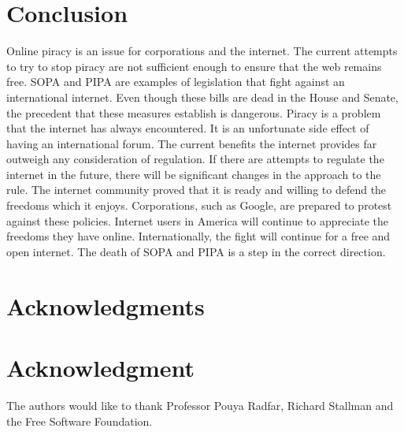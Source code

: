 \documentclass[11pt,journal,compsoc]{IEEEtran}
\begin{document}
\section{Conclusion}
Online piracy is an issue for corporations and the internet. The current attempts to try to stop piracy are not sufficient enough to ensure that the web remains free. SOPA and PIPA are examples of legislation that fight against an international internet. Even though these bills are dead in the House and Senate, the precedent that these measures establish is dangerous. Piracy is a problem that the internet has always encountered. It is an unfortunate side effect of having an international forum. The current benefits the internet provides far outweigh any consideration of regulation.  If there are attempts to regulate the internet in the future, there will be significant changes in the approach to the rule. The internet community proved that it is ready and willing to defend the freedoms which it enjoys. Corporations, such as Google, are prepared to protest against these policies. Internet users in America will continue to appreciate the freedoms they have online. Internationally, the fight will continue for a free and open internet. The death of SOPA and PIPA is a step in the correct direction.

\ifCLASSOPTIONcompsoc
  \section*{Acknowledgments}
\else
  \section*{Acknowledgment}
\fi


The authors would like to thank Professor Pouya Radfar, Richard Stallman and the Free Software Foundation.


\ifCLASSOPTIONcaptionsoff
  \newpage
\fi


\end{document}
